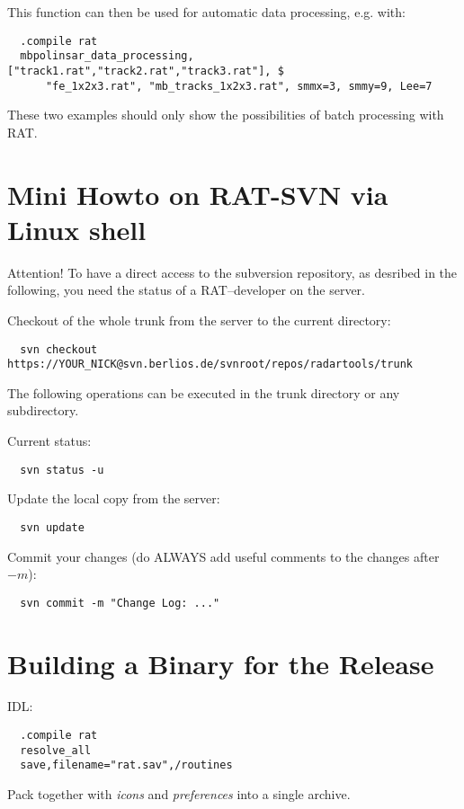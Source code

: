 This function can then be used for automatic data processing, e.g. with:
\begin{verbatim}
  .compile rat
  mbpolinsar_data_processing, ["track1.rat","track2.rat","track3.rat"], $
      "fe_1x2x3.rat", "mb_tracks_1x2x3.rat", smmx=3, smmy=9, Lee=7
\end{verbatim}
These two examples should only show the possibilities of batch processing with RAT.


\section{Mini Howto on RAT-SVN via Linux shell}
Attention! To have a direct access to the subversion repository, as desribed in
the following, you need the status of a RAT--developer on the server.

Checkout of the whole trunk from the server to the current directory:
\begin{verbatim}
  svn checkout https://YOUR_NICK@svn.berlios.de/svnroot/repos/radartools/trunk
\end{verbatim}
The following operations can be executed in the trunk directory or any
subdirectory.

Current status:
\begin{verbatim}
  svn status -u
\end{verbatim}
Update the local copy from the server:
\begin{verbatim}
  svn update
\end{verbatim}
Commit your changes (do ALWAYS add useful comments to the changes after $-m$):
\begin{verbatim}
  svn commit -m "Change Log: ..."
\end{verbatim}


\section{Building a Binary for the Release}
IDL:
\begin{verbatim}
  .compile rat
  resolve_all
  save,filename="rat.sav",/routines
\end{verbatim}
Pack together with \emph{icons} and \emph{preferences} into a single archive.